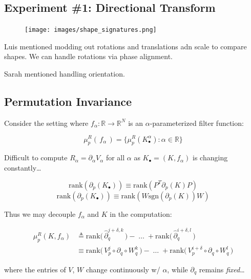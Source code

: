 \documentclass[
  letterpaper,
  DIV=11,
  numbers=noendperiod,
  oneside]{scrartcl}
\begin{document}
\subsection{Experiment \#1: Directional
Transform}\label{experiment-1-directional-transform}

\begin{figure}

{\centering \texttt{[image: images/shape\_signatures.png]}

}

\end{figure}

Luis mentioned modding out rotations and translations adn scale to
compare shapes. We can handle rotations via phase alignment.

Sarah mentioned handling orientation.

\subsection{Permutation Invariance}\label{permutation-invariance}

Consider the setting where \(f_\alpha : \mathbb{R} \to \mathbb{R}^N\) is
an \(\alpha\)-parameterized filter function:

\[ \mu_p^R(\, f_\alpha \, ) = \{ \mu_p^R(K_\bullet^\alpha) : \alpha \in \mathbb{R} \}\]

Difficult to compute \(R_\alpha = \partial_\alpha V_\alpha\) for all
\(\alpha\) as \(K_\bullet = (K, f_\alpha)\) is changing
constantly\ldots{}

\[ \mathrm{rank}(\partial_p(K_\bullet)) \equiv \mathrm{rank}(P^T \partial_p(K) P) \]
\[ \mathrm{rank}(\partial_p(K_\bullet)) \equiv \mathrm{rank}(W \mathrm{sgn}(\partial_p(K)) W) \]

Thus we may decouple \(f_\alpha\) and \(K\) in the computation:

\[
\begin{align*}
 \mu_p^{R}(K,f_\alpha) &\triangleq \mathrm{rank}\big(\,\hat{\partial}_{q}^{j + \delta, k}\,\big) - \; \dots \; + \mathrm{rank}\big(\, \hat{\partial}_{q}^{i + \delta, l}\,\big)  \\
&\equiv \mathrm{rank}\big(\,V_p^j \circ \partial_{q} \circ W_q^k \,\big) - \; \dots \; + \mathrm{rank}\big(\,V_p^{i+\delta} \circ \partial_{q} \circ W_q^l \,\big)
 \end{align*}
 \]

where the entries of \(V\), \(W\) change continuously w/ \(\alpha\),
while \(\partial_q\) remains \emph{fixed}\ldots{}
\end{document}
